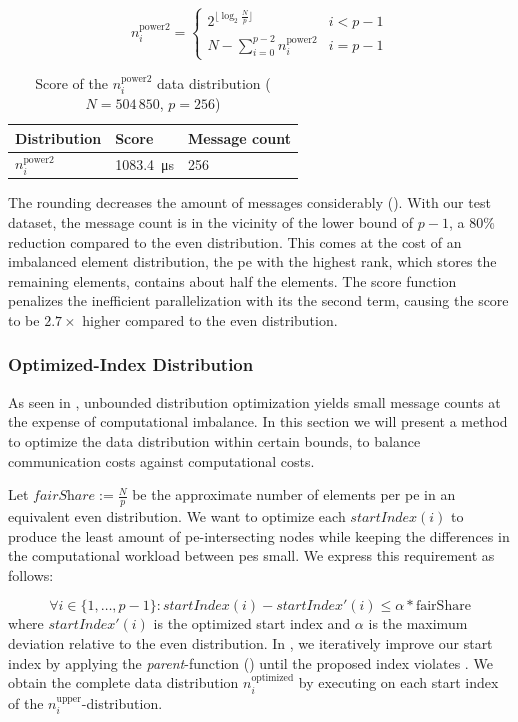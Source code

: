 \begin{equation}
\label{eq:roundDownPower2Distribution}
n_i^\textrm{power2} = \begin{cases}
2^{\lfloor \log_2 \frac{N}{p} \rfloor} & i < p - 1\\
N - \sum_{i=0}^{p-2} n_i^\textrm{power2} & i = p - 1
\end{cases}
\end{equation}

\begin{table}
\centering
\begin{tabular}{l|l|l}
Distribution & Score & Message count \\
\hline
$n_i^\textrm{power2}$ & \SI{1083.4}{\micro\second} & 256
\end{tabular}
\caption{Score of the $n_i^\textrm{power2}$ data distribution ($N = 504\,850$, $p=256$)}
\label{table:Power2DistributionScore}
\end{table}

The rounding decreases the amount of messages considerably ().
With our test dataset, the message count is in the vicinity of the lower bound of $p - 1$, a $80\%$ reduction compared to the even distribution.
This comes at the cost of an imbalanced element distribution, the \gls{pe} with the highest rank, which stores the remaining elements, contains about half the elements.
The score function penalizes the inefficient parallelization with its the second term, causing the score to be $2.7\times$ higher compared to the even distribution.

\subsubsection{Optimized-Index Distribution}
As seen in , unbounded distribution optimization yields small message counts at the expense of computational imbalance.
In this section we will present a method to optimize the data distribution within certain bounds, to balance communication costs against computational costs.

Let $\textit{fairShare} := \tfrac{N}{p}$ be the approximate number of elements per \gls{pe} in an equivalent even distribution.
We want to optimize each $\textit{startIndex}(i)$ to produce the least amount of \gls{pe}-intersecting nodes while keeping the differences in the computational workload between \glspl{pe} small.
We express this requirement as follows:

\begin{equation}
\label{eq:optimizedIndexBounds}
\forall i \in \{1, \ldots, p - 1\}: \textit{startIndex}(i) - \textit{startIndex}'(i) \leq \alpha * \textrm{fairShare}
\end{equation}
where $\textit{startIndex}'(i)$ is the optimized start index and $\alpha$ is the maximum deviation relative to the even distribution.
In , we iteratively improve our start index by applying the \textit{parent}-function () until the proposed index violates .
We obtain the complete data distribution $n_i^\textrm{optimized}$ by executing  on each start index of the $n_i^\textrm{upper}$-distribution.


